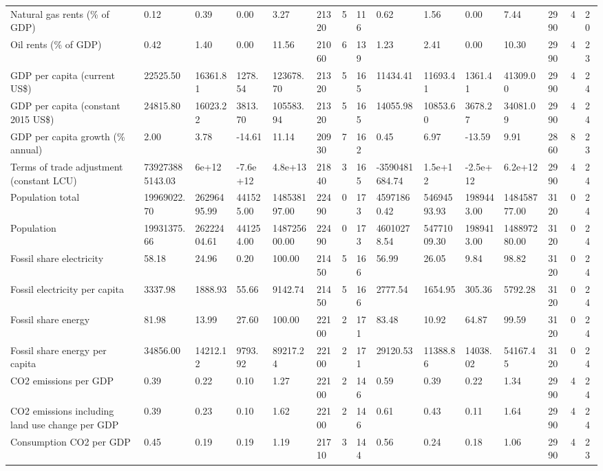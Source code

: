 \begin{longtable}{lllllllllllllll}
Natural gas rents (\% of GDP) & 0.12 & 0.39 & 0.00 & 3.27 & 21320 & 5 & 116 & 0.62 & 1.56 & 0.00 & 7.44 & 2990 & 4 & 20\\
Oil rents (\% of GDP) & 0.42 & 1.40 & 0.00 & 11.56 & 21060 & 6 & 139 & 1.23 & 2.41 & 0.00 & 10.30 & 2990 & 4 & 23\\
GDP per capita (current US\$) & 22525.50 & 16361.81 & 1278.54 & 123678.70 & 21320 & 5 & 165 & 11434.41 & 11693.41 & 1361.41 & 41309.00 & 2990 & 4 & 24\\
GDP per capita (constant 2015 US\$) & 24815.80 & 16023.22 & 3813.70 & 105583.94 & 21320 & 5 & 165 & 14055.98 & 10853.60 & 3678.27 & 34081.09 & 2990 & 4 & 24\\
\addlinespace
GDP per capita growth (\% annual) & 2.00 & 3.78 & -14.61 & 11.14 & 20930 & 7 & 162 & 0.45 & 6.97 & -13.59 & 9.91 & 2860 & 8 & 23\\
Terms of trade adjustment (constant LCU) & 739273885143.03 & 6e+12 & -7.6e+12 & 4.8e+13 & 21840 & 3 & 165 & -3590481684.74 & 1.5e+12 & -2.5e+12 & 6.2e+12 & 2990 & 4 & 24\\
Population total & 19969022.70 & 26296495.99 & 441525.00 & 148538197.00 & 22490 & 0 & 173 & 45971860.42 & 54694593.93 & 1989443.00 & 148458777.00 & 3120 & 0 & 24\\
Population & 19931375.66 & 26222404.61 & 441254.00 & 148725600.00 & 22490 & 0 & 173 & 46010278.54 & 54771009.30 & 1989413.00 & 148897280.00 & 3120 & 0 & 24\\
Fossil share electricity & 58.18 & 24.96 & 0.20 & 100.00 & 21450 & 5 & 166 & 56.99 & 26.05 & 9.84 & 98.82 & 3120 & 0 & 24\\
\addlinespace
Fossil electricity per capita & 3337.98 & 1888.93 & 55.66 & 9142.74 & 21450 & 5 & 166 & 2777.54 & 1654.95 & 305.36 & 5792.28 & 3120 & 0 & 24\\
Fossil share energy & 81.98 & 13.99 & 27.60 & 100.00 & 22100 & 2 & 171 & 83.48 & 10.92 & 64.87 & 99.59 & 3120 & 0 & 24\\
Fossil share energy per capita & 34856.00 & 14212.12 & 9793.92 & 89217.24 & 22100 & 2 & 171 & 29120.53 & 11388.86 & 14038.02 & 54167.45 & 3120 & 0 & 24\\
CO2 emissions per GDP & 0.39 & 0.22 & 0.10 & 1.27 & 22100 & 2 & 146 & 0.59 & 0.39 & 0.22 & 1.34 & 2990 & 4 & 24\\
CO2 emissions including land use change per GDP & 0.39 & 0.23 & 0.10 & 1.62 & 22100 & 2 & 146 & 0.61 & 0.43 & 0.11 & 1.64 & 2990 & 4 & 24\\
\addlinespace
Consumption CO2 per GDP & 0.45 & 0.19 & 0.19 & 1.19 & 21710 & 3 & 144 & 0.56 & 0.24 & 0.18 & 1.06 & 2990 & 4 & 23\\

\end{longtable}
